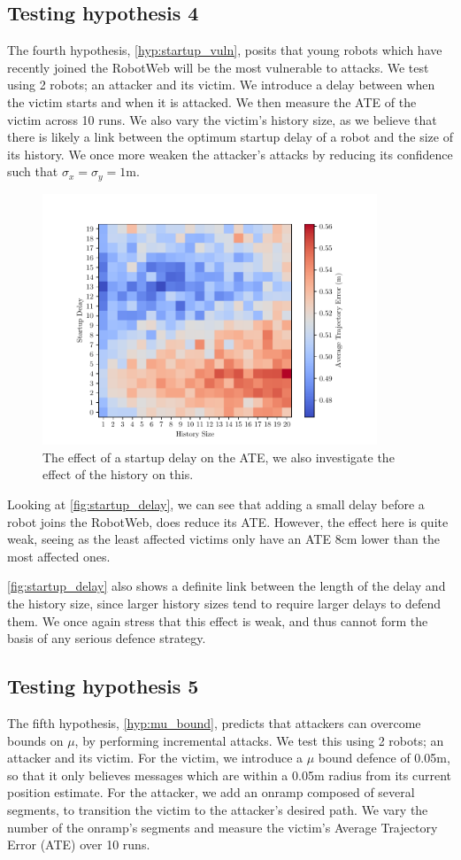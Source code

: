 \subsection{Testing hypothesis 4}
The fourth hypothesis, \ref{hyp:startup_vuln}, posits that young robots which have recently joined the RobotWeb will be the most vulnerable to attacks. We test using 2 robots; an attacker and its victim. We introduce a delay between when the victim starts and when it is attacked. We then measure the ATE of the victim across 10 runs. We also vary the victim's history size, as we believe that there is likely a link between the optimum startup delay of a robot and the size of its history. We once more weaken the attacker's attacks by reducing its confidence such that $\sigma_x = \sigma_y = 1$m.


\begin{figure}[!h]
	\centering
	\includegraphics[width=10cm]{report/graphs/startup_delay.pdf}
	\caption{The effect of a startup delay on the ATE, we also investigate the effect of the history on this.}
	\label{fig:startup_delay}
\end{figure}

Looking at \autoref{fig:startup_delay}, we can see that adding a small delay before a robot joins the RobotWeb, does reduce its ATE. However, the effect here is quite weak, seeing as the least affected victims only have an ATE 8cm lower than the most affected ones.

\autoref{fig:startup_delay} also shows a definite link between the length of the delay and the history size, since larger history sizes tend to require larger delays to defend them. We once again stress that this effect is weak, and thus cannot form the basis of any serious defence strategy.

\subsection{Testing hypothesis 5}
The fifth hypothesis, \ref{hyp:mu_bound}, predicts that attackers can overcome bounds on $\mu$, by performing incremental attacks. We test this using 2 robots; an attacker and its victim. For the victim, we introduce a $\mu$ bound defence of 0.05m, so that it only believes messages which are within a 0.05m radius from its current position estimate. For the attacker, we add an onramp composed of several segments, to transition the victim to the attacker's desired path. We vary the number of the onramp's segments and measure the victim's Average Trajectory Error (ATE) over 10 runs.


